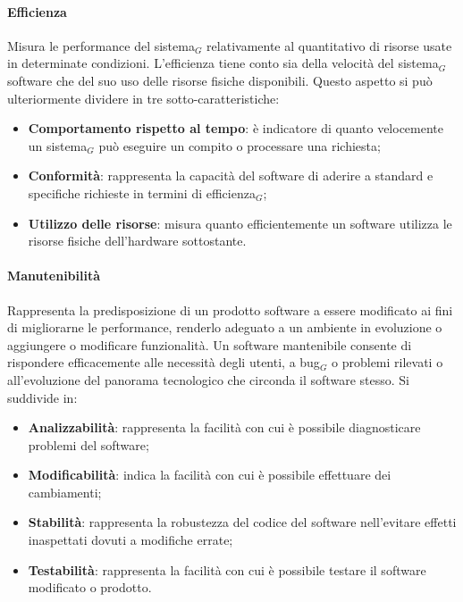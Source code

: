 \documentclass[10pt]{article}
\begin{document}
\begin{justify}
            \paragraph{Efficienza}
            Misura le performance del sistema$_G$ relativamente al quantitativo di risorse usate in determinate condizioni. L'efficienza tiene conto sia della velocità
            del sistema$_G$ software che del suo uso delle risorse fisiche disponibili. Questo aspetto si può ulteriormente dividere in tre sotto-caratteristiche:
            \begin{itemize}
                \item \textbf{Comportamento rispetto al tempo}: è indicatore di quanto velocemente un sistema$_G$ può eseguire un compito o processare una richiesta;
                \item \textbf{Conformità}: rappresenta la capacità del software di aderire a standard e specifiche richieste in termini di efficienza$_G$;
                \item \textbf{Utilizzo delle risorse}: misura quanto efficientemente un software utilizza le risorse fisiche dell'hardware sottostante.
            \end{itemize}

            \paragraph{Manutenibilità}
            Rappresenta la predisposizione di un prodotto software a essere modificato ai fini di migliorarne le performance, renderlo adeguato a un ambiente in evoluzione
            o aggiungere o modificare funzionalità. Un software mantenibile consente di rispondere efficacemente alle necessità degli utenti, a bug$_G$ o problemi rilevati o
            all'evoluzione del panorama tecnologico che circonda il software stesso. Si suddivide in:
            \begin{itemize}
                \item \textbf{Analizzabilità}: rappresenta la facilità con cui è possibile diagnosticare problemi del software;
                \item \textbf{Modificabilità}: indica la facilità con cui è possibile effettuare dei cambiamenti;
                \item \textbf{Stabilità}: rappresenta la robustezza del codice del software nell'evitare effetti inaspettati dovuti a modifiche errate;
                \item \textbf{Testabilità}: rappresenta la facilità con cui è possibile testare il software modificato o prodotto.
            \end{itemize}


\end{justify}
\end{document}

